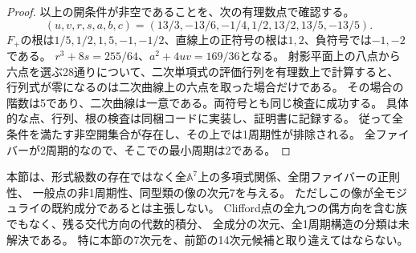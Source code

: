 \begin{proof}
以上の開条件が非空であることを、次の有理数点で確認する。
\begin{equation}\label{eq:seven-rational-point}
 (u,v,r,s,a,b,c)=
 (13/3,-13/6,-1/4,1/2,13/2,13/5,-13/5).
\end{equation}
$F_+$の根は$1/5,1/2,1,5,-1,-1/2$、直線上の正符号の根は$1,2$、負符号では$-1,-2$である。
$r^3+8s=255/64$、$a^2+4uv=169/36$となる。
射影平面上の八点から六点を選ぶ28通りについて、二次単項式の評価行列を有理数上で計算すると、
行列式が零になるのは二次曲線上の六点を取った場合だけである。
その場合の階数は5であり、二次曲線は一意である。両符号とも同じ検査に成功する。
具体的な点、行列、根の検査は同梱コードに実装し、証明書に記録する。
従って全条件を満たす非空開集合が存在し、その上では1周期性が排除される。
全ファイバーが2周期的なので、そこでの最小周期は2である。
\end{proof}

\begin{remark}
本節は、形式級数の存在ではなく全$\mathbb A^7$上の多項式関係、全閉ファイバーの正則性、
一般点の非1周期性、同型類の像の次元7を与える。
ただしこの像が全モジュライの既約成分であるとは主張しない。
Clifford点の全九つの偶方向を含む族でもなく、残る交代方向の代数的積分、
全成分の次元、全1周期構造の分類は未解決である。
特に本節の7次元を、前節の14次元候補と取り違えてはならない。
\end{remark}


